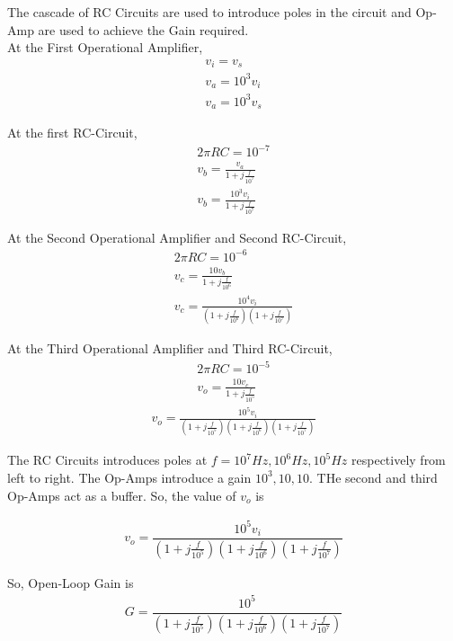 \begin{enumerate}[label=\thesubsection.\arabic*.,ref=\thesubsection.\theenumi]
The cascade of RC Circuits are used to introduce poles in the circuit and Op-Amp are used to achieve the Gain required.\\

At the First Operational Amplifier,
\begin{align}
v_{i} = v_{s}\\
v_{a} = 10^3 v_{i}\\
v_{a} = 10^3 v_{s}
\end{align}

At the first RC-Circuit,
\begin{align}
2\pi RC = 10^{-7}\\
v_{b} = \frac{v_{a}}{1 + j\frac{f}{10^{7}}}\\
v_{b} = \frac{10^3 v_{i}}{1 + j\frac{f}{10^{7}}}
\end{align}

At the Second Operational Amplifier and Second RC-Circuit,
\begin{align}
2\pi RC = 10^{-6}\\
v_{c} = \frac{10v_{b}}{1 + j\frac{f}{10^{6}}}\\
v_{c} = \frac{10^4 v_{i}}{(1 + j\frac{f}{10^{6}})(1 + j\frac{f}{10^{7}})}
\end{align}

At the Third Operational Amplifier and Third RC-Circuit,
\begin{align}
2\pi RC = 10^{-5}\\
v_{o} = \frac{10v_{c}}{1 + j\frac{f}{10^{5}}}
\end{align}
\begin{align}
v_{o} = \frac{10^5 v_{i}}{(1 + j\frac{f}{10^{5}})(1 + j\frac{f}{10^{6}})(1 + j\frac{f}{10^{7}})}
\end{align}

The RC Circuits introduces poles at $f=10^{7} Hz, 10^{6} Hz, 10^{5} Hz$ respectively from left to right. The Op-Amps introduce a gain  $10^{3},10,10$. THe second and third Op-Amps act as a buffer. So, the value of $v_{o}$ is

\begin{align}
v_{o} = \dfrac{10^5 v_{i}}{\left(1+j\frac{f}{10^{5}}\right)\left(1+j\frac{f}{10^{6}}\right)\left(1+j\frac{f}{10^{7}}\right)}
\end{align}

So, Open-Loop Gain is
\begin{align}
G = \dfrac{10^5}{\left(1+j\frac{f}{10^{5}}\right)\left(1+j\frac{f}{10^{6}}\right)\left(1+j\frac{f}{10^{7}}\right)}
\end{align}


\end{enumerate}
